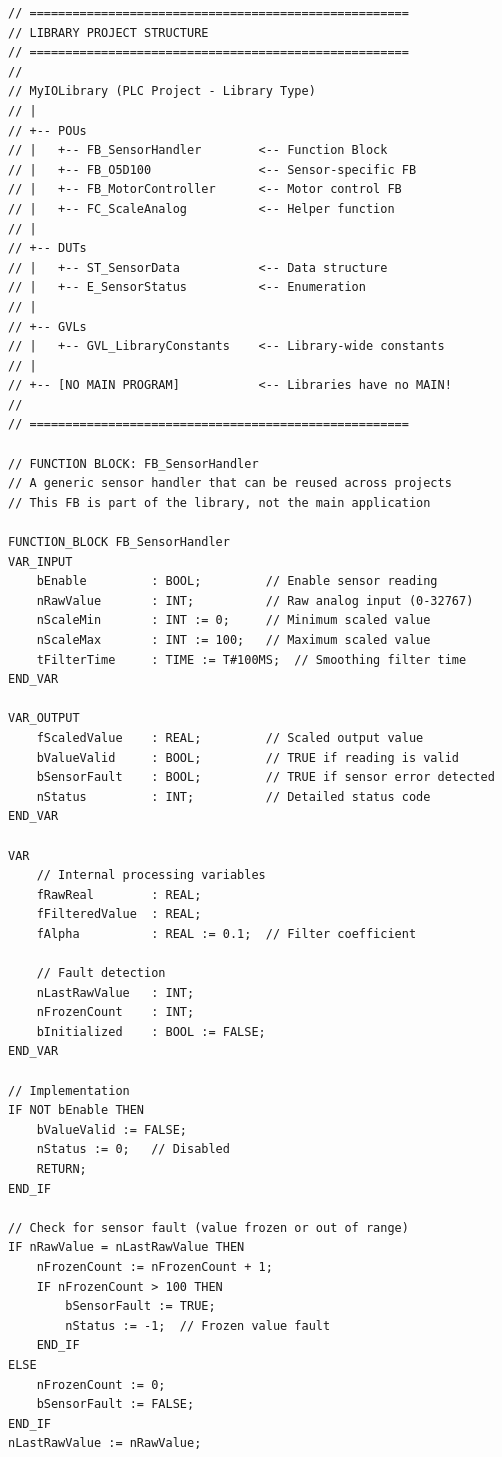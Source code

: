 \documentclass[11pt,a4paper]{article}
\begin{document}
\begin{lstlisting}
// =====================================================
// LIBRARY PROJECT STRUCTURE
// =====================================================
// 
// MyIOLibrary (PLC Project - Library Type)
// |
// +-- POUs
// |   +-- FB_SensorHandler        <-- Function Block
// |   +-- FB_O5D100               <-- Sensor-specific FB
// |   +-- FB_MotorController      <-- Motor control FB
// |   +-- FC_ScaleAnalog          <-- Helper function
// |
// +-- DUTs
// |   +-- ST_SensorData           <-- Data structure
// |   +-- E_SensorStatus          <-- Enumeration
// |
// +-- GVLs
// |   +-- GVL_LibraryConstants    <-- Library-wide constants
// |
// +-- [NO MAIN PROGRAM]           <-- Libraries have no MAIN!
//
// =====================================================

// FUNCTION BLOCK: FB_SensorHandler
// A generic sensor handler that can be reused across projects
// This FB is part of the library, not the main application

FUNCTION_BLOCK FB_SensorHandler
VAR_INPUT
    bEnable         : BOOL;         // Enable sensor reading
    nRawValue       : INT;          // Raw analog input (0-32767)
    nScaleMin       : INT := 0;     // Minimum scaled value
    nScaleMax       : INT := 100;   // Maximum scaled value
    tFilterTime     : TIME := T#100MS;  // Smoothing filter time
END_VAR

VAR_OUTPUT
    fScaledValue    : REAL;         // Scaled output value
    bValueValid     : BOOL;         // TRUE if reading is valid
    bSensorFault    : BOOL;         // TRUE if sensor error detected
    nStatus         : INT;          // Detailed status code
END_VAR

VAR
    // Internal processing variables
    fRawReal        : REAL;
    fFilteredValue  : REAL;
    fAlpha          : REAL := 0.1;  // Filter coefficient
    
    // Fault detection
    nLastRawValue   : INT;
    nFrozenCount    : INT;
    bInitialized    : BOOL := FALSE;
END_VAR

// Implementation
IF NOT bEnable THEN
    bValueValid := FALSE;
    nStatus := 0;   // Disabled
    RETURN;
END_IF

// Check for sensor fault (value frozen or out of range)
IF nRawValue = nLastRawValue THEN
    nFrozenCount := nFrozenCount + 1;
    IF nFrozenCount > 100 THEN
        bSensorFault := TRUE;
        nStatus := -1;  // Frozen value fault
    END_IF
ELSE
    nFrozenCount := 0;
    bSensorFault := FALSE;
END_IF
nLastRawValue := nRawValue;


\end{lstlisting}
\end{document}
